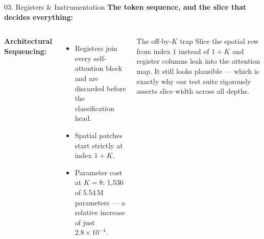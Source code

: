 \documentclass[aspectratio=169]{beamer}
\begin{document}
\begin{frame}{03. Registers \& Instrumentation}
\small
\textbf{The token sequence, and the slice that decides everything:}
\begin{center}
\setlength{\fboxsep}{5pt}
\end{center}

\smallskip
\begin{columns}[T]
\textbf{Architectural Sequencing:}
\begin{itemize}\itemsep=2pt
\item Registers join every self-attention block and are discarded before the classification head.
\item Spatial patches start strictly at index $1 + K$.
\item Parameter cost at $K = 8$: 1{,}536 of 5.54\,M parameters --- a relative increase of just $2.8 \times 10^{-4}$.
\end{itemize}

\begin{alertblock}{The off-by-$K$ trap}
Slice the spatial row from index 1 instead of $1 + K$ and register columns leak into the attention map. It still looks plausible --- which is exactly why our test suite rigorously asserts slice width across all depths.
\end{alertblock}
\end{columns}
\end{frame}
\end{document}
